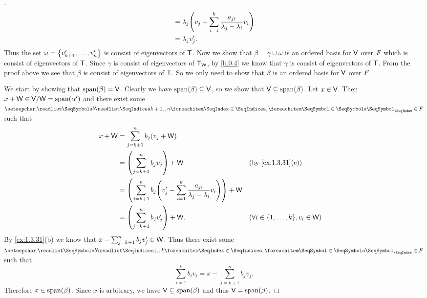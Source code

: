\begin{proof}[]
\begin{align*}
		         & = \lambda_j \pa{v_j + \sum_{i = 1}^k \frac{a_{j i}}{\lambda_j - \lambda_i} v_i}                                                      \\
		         & = \lambda_j v_j'.
	\end{align*}
	Thus the set \(\omega = \left\lbrace v_{k + 1}', \dots, v_n'\right\rbrace\) is consist of eigenvectors of \(\mathsf{T}\).
	Now we show that \(\beta = \gamma \cup \omega\) is an ordered basis for \(\mathsf{V}\) over \(\mathit{F}\) which is consist of eigenvectors of \(\mathsf{T}\).
	Since \(\gamma\) is consist of eigenvectors of \(\mathsf{T}_{\mathsf{W}}\), by \cref{b.0.4} we know that \(\gamma\) is consist of eigenvectors of \(\mathsf{T}\).
	From the proof above we see that \(\beta\) is consist of eigenvectors of \(\mathsf{T}\).
	So we only need to show that \(\beta\) is an ordered basis for \(\mathsf{V}\) over \(\mathit{F}\).

	We start by showing that \(\spn{\beta} = \V\).
	Clearly we have \(\spn{\beta} \subseteq \V\), so we show that \(\V \subseteq \spn{\beta}\).
	Let \(x \in \mathsf{V}\).
	Then \(x + \W \in \V / \W = \spn{\alpha'}\) and there exist some \(\seq{b}{k+1,,n} \in \F\) such that
	\begin{align*}
		x + \W & = \sum_{j = k + 1}^n b_j (v_j + \W)                                                                                                                        \\
		       & = \pa{\sum_{j = k + 1}^n b_j v_j} + \W                                                                  &  & \by{ex:1.3.31}[c]                             \\
		       & = \pa{\sum_{j = k + 1}^n b_j \pa{v_j' - \sum_{i = 1}^k \frac{a_{j i}}{\lambda_j - \lambda_i} v_i}} + \W                                                    \\
		       & = \pa{\sum_{j = k + 1}^n b_j v_j'} + \W.                                                                &  & (\forall i \in \set{1, \dots, k}, v_i \in \W)
	\end{align*}
	By \cref{ex:1.3.31}(b) we know that \(x - \sum_{j = k + 1}^n b_j v_j' \in \mathsf{W}\).
	Thus there exist some \(\seq{b}{1,,k} \in \F\) such that
	\[
		\sum_{i = 1}^k b_i v_i = x - \sum_{j = k + 1}^n b_j v_j.
	\]
	Therefore \(x \in \spn{\beta}\).
	Since \(x\) is arbitrary, we have \(\V \subseteq \spn{\beta}\) and thus \(\V = \spn{\beta}\).


\end{proof}

